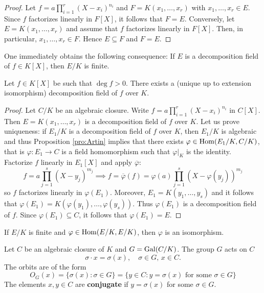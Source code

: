 \begin{proof}
    Let $f=a\prod_{i=1}^r(X-x_i)^{n_i}$ and $F=K(x_1,\dots,x_r)$ with $x_1,\dots,x_r\in E$. Since $f$
    factorizes linearly in $F[X]$, it follows that $F=E$. 
    Conversely, let $E=K(x_1,\dots,x_r)$ and assume that $f$ factorizes linearly
    in $F[X]$. Then, in particular, $x_1,\dots,x_r\in F$. Hence $E\subseteq F$ and
    $F=E$. 
\end{proof}

One immediately obtains the following consequence:
If $E$ is a decomposition field of $f\in K[X]$, then $E/K$ is finite. 

\begin{theorem}
    Let $f\in K[X]$ be such that $\deg f>0$. There exists a (unique up to extension isomorphism) 
    decomposition field of $f$ over $K$. 
\end{theorem}

\begin{proof}
    Let $C/K$ be an algebraic closure. Write $f=a\prod_{i=1}^r(X-x_i)^{n_i}$ in $C[X]$. 
    Then $E=K(x_1,\dots,x_r)$ is a decomposition field of $f$ over $K$. Let us prove
    uniqueness: if $E_1/K$ is a decomposition field of $f$ over $K$, 
    then $E_1/K$ is algebraic and thus Proposition
    \ref{pro:Artin} implies that 
    there exists $\varphi\in\operatorname{Hom}(E_1/K,C/K)$, that is $\varphi\colon E_1\to C$ is a field
    homomorphism such that $\varphi|_K$ is the identity.
    Factorize $f$ linearly in $E_1[X]$ and apply $\overline{\varphi}$:
    \[
    f=a\prod_{j=1}^s(X-y_j)^{m_j}
    \implies
    f=\overline{\varphi}(f)=\varphi(a)\prod_{j=1}^s(X-\varphi(y_j))^{m_j}
    \]
    so $f$ factorizes linearly in $\varphi(E_1)$. Moreover, 
    $E_1=K(y_1,\dots,y_s)$ and it follows that 
    $\varphi(E_1)=K(\varphi(y_1),\dots,\varphi(y_s))$. Thus
    $\varphi(E_1)$ is a decomposition field of $f$. Since  
    $\varphi(E_1)\subseteq C$, it follows that $\varphi(E_1)=E$. 
\end{proof}

\begin{exercise}
If $E/K$ is finite and $\varphi\in\operatorname{Hom}(E/K,E/K)$, 
then $\varphi$ is an isomorphism. 
\end{exercise}

Let $C$ be an algebraic closure of $K$ and 
$G=\operatorname{Gal}(C/K)$. The group $G$ acts on $C$
\[
\sigma\cdot x=\sigma(x),\quad
\sigma\in G,\,x\in C.
\]
The orbits 
are of the form 
\[
O_G(x)=\{\sigma(x):\sigma\in G\}
=\{y\in C:y=\sigma(x)\text{ for some $\sigma\in G$}\}
\]
The elements $x,y\in C$ are \textbf{conjugate} 
if $y=\sigma(x)$ for some $\sigma\in G$. 


